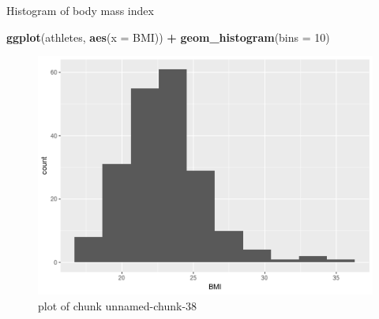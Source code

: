 \documentclass[ignorenonframetext,]{beamer}
\newenvironment{Shaded}{\begin{snugshade}}{\end{snugshade}}
\newcommand{\DataTypeTok}[1]{\textcolor[rgb]{0.13,0.29,0.53}{#1}}
\newcommand{\DecValTok}[1]{\textcolor[rgb]{0.00,0.00,0.81}{#1}}
\newcommand{\KeywordTok}[1]{\textcolor[rgb]{0.13,0.29,0.53}{\textbf{#1}}}
\newcommand{\NormalTok}[1]{#1}
\newcommand{\OperatorTok}[1]{\textcolor[rgb]{0.81,0.36,0.00}{\textbf{#1}}}
\newcommand{\StringTok}[1]{\textcolor[rgb]{0.31,0.60,0.02}{#1}}
\begin{document}
\begin{frame}[fragile]{Histogram of body mass index}
\protect\hypertarget{histogram-of-body-mass-index}{}

\begin{Shaded}
\begin{Highlighting}[]
\KeywordTok{ggplot}\NormalTok{(athletes, }\KeywordTok{aes}\NormalTok{(}\DataTypeTok{x =}\NormalTok{ BMI)) }\OperatorTok{+}\StringTok{ }\KeywordTok{geom_histogram}\NormalTok{(}\DataTypeTok{bins =} \DecValTok{10}\NormalTok{)}
\end{Highlighting}
\end{Shaded}

\begin{figure}
\centering
\includegraphics{figure/unnamed-chunk-38-1.png}
\caption{plot of chunk unnamed-chunk-38}
\end{figure}

\end{frame}
\end{document}
